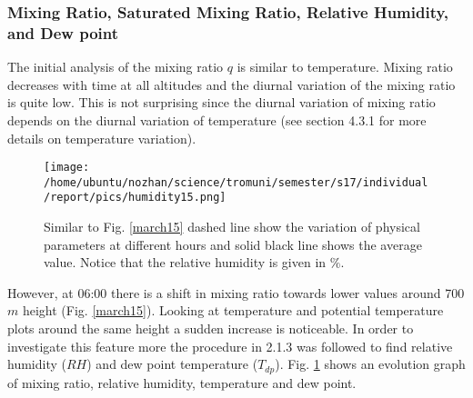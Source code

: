 \documentclass[a4paper,12pt]{article}
\numberwithin{equation}{section} %
\begin{document}

\subsubsection{Mixing Ratio, Saturated Mixing Ratio, Relative Humidity, and Dew point}

The initial analysis of the mixing ratio $q$ is similar to temperature. Mixing ratio decreases with time at all altitudes and the diurnal variation of the mixing ratio is quite low. This is not surprising since the diurnal variation of mixing ratio depends on the diurnal variation of temperature (see section 4.3.1 for more details on temperature variation). 

\begin{figure}[bhp]
\texttt{[image: /home/ubuntu/nozhan/science/tromuni/semester/s17/individual/report/pics/humidity15.png]}
\caption{Similar to Fig. \ref{march15} dashed line show the variation of physical parameters at different hours and solid black line shows the average value. Notice that the relative humidity is given in $\%$.}
\label{humidity15}
\end{figure}

However, at 06:00 there is a shift in mixing ratio towards lower values around 700 $m$ height (Fig. \ref{march15}). Looking at temperature and potential temperature plots around the same height a sudden increase is noticeable. In order to investigate this feature more the procedure in 2.1.3 was followed to find relative humidity ($RH$) and dew point temperature ($T_{dp}$). Fig. \ref{humidity15} shows an evolution graph of mixing ratio, relative humidity, temperature and dew point. 
\end{document}
